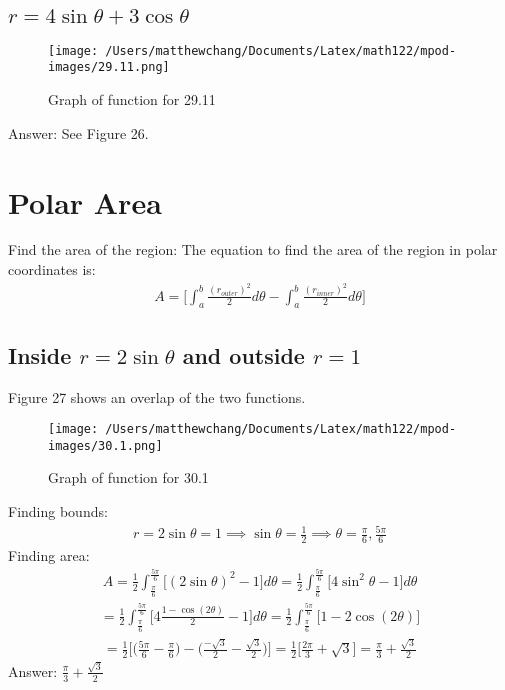 \documentclass{article}
\begin{document}
\subsection{$r = 4 \sin{\theta} + 3 \cos{\theta}$}
\begin{figure}
	\centering
	\texttt{[image: /Users/matthewchang/Documents/Latex/math122/mpod-images/29.11.png]}
	\caption{Graph of function for 29.11}
\end{figure}
Answer: See Figure 26. 

\section{Polar Area}
Find the area of the region:
The equation to find the area of the region in polar coordinates is:
\begin{align*}
	A = \bigg[ \int_a^b \frac{(r_{outer})^2}{2} d\theta - \int_a^b \frac{(r_{inner})^2}{2} d\theta \bigg]
\end{align*}
\subsection{Inside $r = 2 \sin{\theta}$ and outside $r = 1$}
Figure 27 shows an overlap of the two functions. \\[10pt]
\begin{figure}
	\centering
	\texttt{[image: /Users/matthewchang/Documents/Latex/math122/mpod-images/30.1.png]}
	\caption{Graph of function for 30.1}
\end{figure}
Finding bounds:
\begin{align*}
	r = 2\sin{\theta} = 1 \implies \sin{\theta} = \frac{1}{2} \implies \theta = \frac{\pi}{6}, \frac{5\pi}{6}
\end{align*}
Finding area:
\begin{align*}
	A = \frac{1}{2}\int_{\frac{\pi}{6}}^{\frac{5\pi}{6}} \bigg[ (2\sin{\theta})^2 - 1  \bigg] d\theta = \frac{1}{2} \int_{\frac{\pi}{6}}^{\frac{5\pi}{6}} \bigg[ 4\sin^2{\theta} - 1 \bigg] d\theta
\end{align*}
\begin{align*}
	= \frac{1}{2} \int_{\frac{\pi}{6}}^{\frac{5\pi}{6}} \bigg[ 4\frac{1 - \cos{(2\theta)}}{2} - 1 \bigg] d\theta = \frac{1}{2} \int_{\frac{\pi}{6}}^{\frac{5\pi}{6}} \bigg[ 1 - 2\cos{(2\theta)} \bigg]
\end{align*}
\begin{align*}
	= \frac{1}{2} \bigg[ \bigg( \frac{5\pi}{6} - \frac{\pi}{6} \bigg) - \bigg( \frac{-\sqrt{3}}{2} - \frac{\sqrt{3}}{2} \bigg) \bigg] = \frac{1}{2} \bigg[ \frac{2\pi}{3} + \sqrt{3} \bigg] = \frac{\pi}{3} + \frac{\sqrt{3}}{2}
\end{align*}
Answer: $\frac{\pi}{3} + \frac{\sqrt{3}}{2}$
\end{document}

